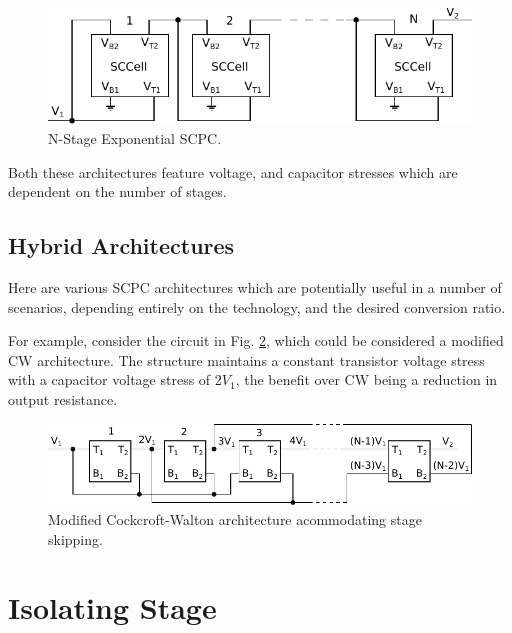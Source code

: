 	\begin{figure}
		\centering
		\includegraphics{4Terminal/Figures/Exponential.pdf}
		\caption{N-Stage Exponential SCPC.}
		\label{fig:exponential}
	\end{figure}
	
	Both these architectures feature voltage, and capacitor stresses which are dependent on the number of stages. 

	\subsection{Hybrid Architectures}
	Here are various SCPC architectures which are potentially useful in a number of scenarios, depending entirely on the technology, and the desired conversion ratio.
	
	For example, consider the circuit in Fig. \ref{fig:StageSkip}, which could be considered a modified CW architecture. The structure maintains a constant transistor voltage stress with a capacitor voltage stress of 2$V_1$, the benefit over CW being a reduction in output resistance.
	
	\begin{figure}
		\centering
		\includegraphics[width=0.7\linewidth]{4Terminal/Figures/StageSkip.pdf}
		\caption{Modified Cockcroft-Walton architecture acommodating stage skipping.}
		\label{fig:StageSkip}
	\end{figure}
	
	\section{Isolating Stage}
	